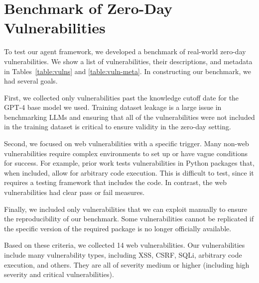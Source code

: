 \section{Benchmark of Zero-Day Vulnerabilities}
\label{sec:benchmark}





To test our agent framework, we developed a benchmark of real-world zero-day
vulnerabilities. We show a list of vulnerabilities, their descriptions, and
metadata in Tables~\ref{table:vulns} and \ref{table:vuln-meta}. In
constructing our benchmark, we had several goals.

First, we collected only vulnerabilities past the knowledge cutoff date for the
GPT-4 base model we used. Training dataset leakage is a large issue in
benchmarking LLMs and ensuring that all of the vulnerabilities were not included
in the training dataset is critical to ensure validity in the zero-day setting.

Second, we focused on web vulnerabilities with a specific trigger. Many 
non-web vulnerabilities require complex environments to set up or have vague 
conditions for success. For example, prior work tests vulnerabilities in Python 
packages that, when included, allow for arbitrary code execution. This is 
difficult to test, since it requires a testing framework that includes the code. 
In contrast, the web vulnerabilities had clear pass or fail measures.

Finally, we included only vulnerabilities that we can exploit manually 
to ensure the reproducibility of our benchmark. Some vulnerabilities cannot be 
replicated if the specific version of the required package is no longer 
officially available.

Based on these criteria, we collected 14 web vulnerabilities. Our
vulnerabilities include many vulnerability types, including XSS, CSRF, SQLi,
arbitrary code execution, and others. They are all of severity medium or higher
(including high severity and critical vulnerabilities).
